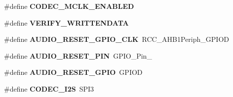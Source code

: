 \begin{DoxyCompactItemize}
\item 
\hypertarget{group___s_t_m32_f4___d_i_s_c_o_v_e_r_y___a_u_d_i_o___c_o_d_e_c___exported___constants_ga9a4e874da3fdcd683c9507e035f8fcad}{\#define {\bfseries C\-O\-D\-E\-C\-\_\-\-M\-C\-L\-K\-\_\-\-E\-N\-A\-B\-L\-E\-D}}\label{group___s_t_m32_f4___d_i_s_c_o_v_e_r_y___a_u_d_i_o___c_o_d_e_c___exported___constants_ga9a4e874da3fdcd683c9507e035f8fcad}

\item 
\hypertarget{group___s_t_m32_f4___d_i_s_c_o_v_e_r_y___a_u_d_i_o___c_o_d_e_c___exported___constants_gaa73ae4b5ff361fcb816e5e37ae463efe}{\#define {\bfseries V\-E\-R\-I\-F\-Y\-\_\-\-W\-R\-I\-T\-T\-E\-N\-D\-A\-T\-A}}\label{group___s_t_m32_f4___d_i_s_c_o_v_e_r_y___a_u_d_i_o___c_o_d_e_c___exported___constants_gaa73ae4b5ff361fcb816e5e37ae463efe}

\item 
\hypertarget{group___s_t_m32_f4___d_i_s_c_o_v_e_r_y___a_u_d_i_o___c_o_d_e_c___exported___constants_gaaedde58fcdc1b0a344c558cb53dc1640}{\#define {\bfseries A\-U\-D\-I\-O\-\_\-\-R\-E\-S\-E\-T\-\_\-\-G\-P\-I\-O\-\_\-\-C\-L\-K}~R\-C\-C\-\_\-\-A\-H\-B1\-Periph\-\_\-\-G\-P\-I\-O\-D}\label{group___s_t_m32_f4___d_i_s_c_o_v_e_r_y___a_u_d_i_o___c_o_d_e_c___exported___constants_gaaedde58fcdc1b0a344c558cb53dc1640}

\item 
\hypertarget{group___s_t_m32_f4___d_i_s_c_o_v_e_r_y___a_u_d_i_o___c_o_d_e_c___exported___constants_ga4d60ca2a691caa4cd02d48916ef8edf2}{\#define {\bfseries A\-U\-D\-I\-O\-\_\-\-R\-E\-S\-E\-T\-\_\-\-P\-I\-N}~G\-P\-I\-O\-\_\-\-Pin\-\_}\label{group___s_t_m32_f4___d_i_s_c_o_v_e_r_y___a_u_d_i_o___c_o_d_e_c___exported___constants_ga4d60ca2a691caa4cd02d48916ef8edf2}

\item 
\hypertarget{group___s_t_m32_f4___d_i_s_c_o_v_e_r_y___a_u_d_i_o___c_o_d_e_c___exported___constants_ga9e14d8b79acddb3613832e236b5c205f}{\#define {\bfseries A\-U\-D\-I\-O\-\_\-\-R\-E\-S\-E\-T\-\_\-\-G\-P\-I\-O}~G\-P\-I\-O\-D}\label{group___s_t_m32_f4___d_i_s_c_o_v_e_r_y___a_u_d_i_o___c_o_d_e_c___exported___constants_ga9e14d8b79acddb3613832e236b5c205f}

\item 
\hypertarget{group___s_t_m32_f4___d_i_s_c_o_v_e_r_y___a_u_d_i_o___c_o_d_e_c___exported___constants_gab5679e52b55a319cfe3a04e76bd3684b}{\#define {\bfseries C\-O\-D\-E\-C\-\_\-\-I2\-S}~S\-P\-I3}\label{group___s_t_m32_f4___d_i_s_c_o_v_e_r_y___a_u_d_i_o___c_o_d_e_c___exported___constants_gab5679e52b55a319cfe3a04e76bd3684b}


\end{DoxyCompactItemize}
